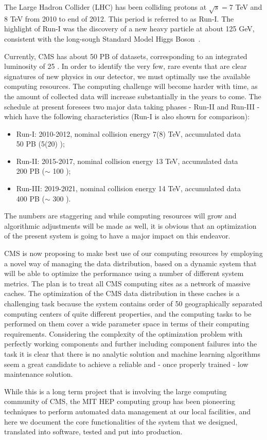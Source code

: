 The Large Hadron Collider (LHC) has been colliding protons at $\sqrt{s}=$7 TeV and 8 TeV from 2010 to end of 2012. 
This period is referred to as Run-I. The highlight of Run-I was the discovery of a new heavy particle at about 125 GeV, 
consistent with the long-sough Standard Model Higgs Boson~\cite{ATLASHiggs,CMSHiggs}. 

Currently, CMS has about 50 PB of datasets, corresponding to an integrated luminosity of 25 \fbinv. In order to identify 
the very few, rare events that are clear signatures of new physics in our detector, we must optimally use the available 
computing resources. The computing challenge will become harder with time, as the amount of collected data will increase 
substantially in the years to come. The schedule at present foresees two major data taking phases - Run-II and Run-III - 
which have the following characteristics (Run-I is also shown for comparison):

\begin{itemize}
	\item Run-I: 2010-2012, nominal collision energy 7(8) TeV, accumulated data \\ 50 PB (5(20) \fbinv); 
	\item Run-II: 2015-2017, nominal collision energy 13 TeV, accumulated data \\ 200 PB ($\sim$ 100 \fbinv); 
	\item Run-III: 2019-2021, nominal collision energy 14 TeV, accumulated data \\ 400 PB ($\sim$ 300 \fbinv). 
\end{itemize}
The numbers are staggering and while computing resources will grow and algorithmic adjustments will be made as well, it is 
obvious that an optimization of the present system is going to have a major impact on this endeavor.

CMS is now proposing to make best use of our computing resources by employing a novel way of managing the data distribution, based on a dynamic system that will be able to optimize the performance using a number of different system metrics.
The plan is to treat all CMS computing sites as a network of massive caches. The optimization of the CMS data distribution in these caches is a challenging task because the system contains order of 50 geographically separated computing centers of quite different properties, and the computing tasks to be performed on them cover a wide parameter space in terms of their computing requirements. Considering the complexity of the optimization problem with perfectly working components and further including component failures into the task it is clear that there is no analytic solution and machine learning algorithms seem a great candidate to achieve a reliable and - once properly trained - low maintenance solution.

While this is a long term project that is involving the large computing community of CMS, the MIT HEP computing group has been pioneering techniques to perform 
automated data management at our local facilities, and here we document the core functionalities of the system that we designed, 
translated into software, tested and put into production.
